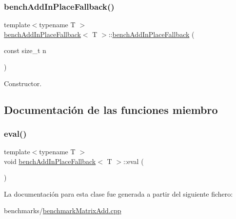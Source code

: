 \subsubsection{\texorpdfstring{bench\+Add\+In\+Place\+Fallback()}{benchAddInPlaceFallback()}}
{\footnotesize\ttfamily template$<$typename T $>$ \\
\hyperlink{classbenchAddInPlaceFallback}{bench\+Add\+In\+Place\+Fallback}$<$ T $>$\+::\hyperlink{classbenchAddInPlaceFallback}{bench\+Add\+In\+Place\+Fallback} (\begin{DoxyParamCaption}\item[{const size\+\_\+t}]{n }\end{DoxyParamCaption})\hspace{0.3cm}{\ttfamily [inline]}}



Constructor. 



\subsection{Documentación de las funciones miembro}
\mbox{\label{classbenchAddInPlaceFallback_ac2857d6a2cae1f4b0a3ec449164b968b}} 
\subsubsection{\texorpdfstring{eval()}{eval()}}
{\footnotesize\ttfamily template$<$typename T $>$ \\
void \hyperlink{classbenchAddInPlaceFallback}{bench\+Add\+In\+Place\+Fallback}$<$ T $>$\+::eval (\begin{DoxyParamCaption}{ }\end{DoxyParamCaption})\hspace{0.3cm}{\ttfamily [inline]}}



La documentación para esta clase fue generada a partir del siguiente fichero\+:\begin{DoxyCompactItemize}
\item 
benchmarks/\hyperlink{benchmarkMatrixAdd_8cpp}{benchmark\+Matrix\+Add.\+cpp}\end{DoxyCompactItemize}
